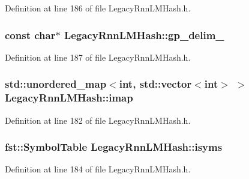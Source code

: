 Definition at line 186 of file Legacy\+Rnn\+L\+M\+Hash.\+h.

\subsubsection[{gp\+\_\+delim\+\_\+}]{\setlength{\rightskip}{0pt plus 5cm}const char$\ast$ Legacy\+Rnn\+L\+M\+Hash\+::gp\+\_\+delim\+\_\+}\hypertarget{class_legacy_rnn_l_m_hash_aa0df8057995fb6758849910fb5d0c1e2}{}\label{class_legacy_rnn_l_m_hash_aa0df8057995fb6758849910fb5d0c1e2}


Definition at line 187 of file Legacy\+Rnn\+L\+M\+Hash.\+h.

\subsubsection[{imap}]{\setlength{\rightskip}{0pt plus 5cm}std\+::unordered\+\_\+map$<$int, std\+::vector$<$int$>$ $>$ Legacy\+Rnn\+L\+M\+Hash\+::imap}\hypertarget{class_legacy_rnn_l_m_hash_acfb8a7033158a75c62ceec1c06b44821}{}\label{class_legacy_rnn_l_m_hash_acfb8a7033158a75c62ceec1c06b44821}


Definition at line 182 of file Legacy\+Rnn\+L\+M\+Hash.\+h.

\subsubsection[{isyms}]{\setlength{\rightskip}{0pt plus 5cm}fst\+::\+Symbol\+Table Legacy\+Rnn\+L\+M\+Hash\+::isyms}\hypertarget{class_legacy_rnn_l_m_hash_aae1c188827296cc340a68e100dc95695}{}\label{class_legacy_rnn_l_m_hash_aae1c188827296cc340a68e100dc95695}


Definition at line 184 of file Legacy\+Rnn\+L\+M\+Hash.\+h.

